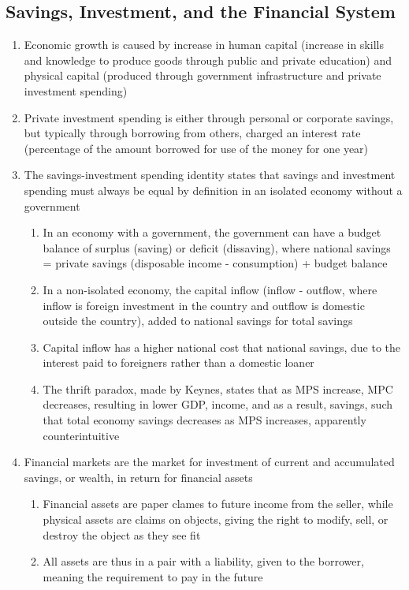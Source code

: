 \documentclass[11 pt, twoside]{article}
\begin{document}
\subsection{Savings, Investment, and the Financial System}
\begin{enumerate}
\item Economic growth is caused by increase in human capital (increase in skills and knowledge to produce goods through public and private education) and physical capital (produced through government infrastructure and private investment spending)
\item Private investment spending is either through personal or corporate savings, but typically through borrowing from others, charged an interest rate (percentage of the amount borrowed for use of the money for one year)
\item The savings-investment spending identity states that savings and investment spending must always be equal by definition in an isolated economy without a government
\begin{enumerate}
\item In an economy with a government, the government can have a budget balance of surplus (saving) or deficit (dissaving), where national savings = private savings (disposable income - consumption) + budget balance
\item In a non-isolated economy, the capital inflow (inflow - outflow, where inflow is foreign investment in the country and outflow is domestic outside the country), added to national savings for total savings
\item Capital inflow has a higher national cost that national savings, due to the interest paid to foreigners rather than a domestic loaner
\item The thrift paradox, made by Keynes, states that as MPS increase, MPC decreases, resulting in lower GDP, income, and as a result, savings, such that total economy savings decreases as MPS increases, apparently counterintuitive
\end{enumerate}
\item Financial markets are the market for investment of current and accumulated savings, or wealth, in return for financial assets
\begin{enumerate}
\item Financial assets are paper clames to future income from the seller, while physical assets are claims on objects, giving the right to modify, sell, or destroy the object as they see fit
\item All assets are thus in a pair with a liability, given to the borrower, meaning the requirement to pay in the future

\end{enumerate}
\end{enumerate}
\end{document}
